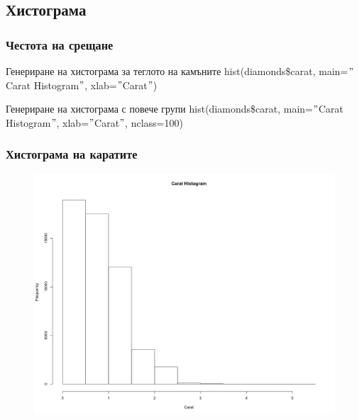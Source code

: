 \documentclass{beamer}
\begin{document}
\subsection{Хистограма}

\begin{frame}
\frametitle{Честота на срещане}
\begin{block}{Генериране на хистограма за теглото на камъните}
hist(diamonds\$carat, main=$"$Carat Histogram$"$, xlab=$"$Carat$"$)
\end{block}

\begin{block}{Генериране на хистограма с повече групи}
hist(diamonds\$carat, main=$"$Carat Histogram$"$, xlab=$"$Carat$"$, nclass=100)
\end{block}
\end{frame}

\begin{frame}
\frametitle{Хистограма на каратите}
\begin{figure}[]\includegraphics[width=\textwidth,height=0.75\textheight]{pic0021}\end{figure}
\end{frame}
\end{document}
